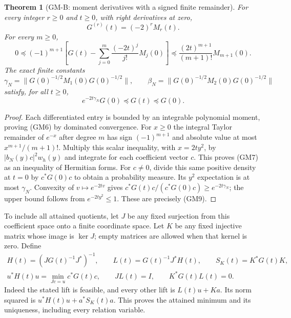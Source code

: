 \documentclass[11pt]{article}
\newtheorem{theorem}{Theorem}
\theoremstyle{remark}\newtheorem{remark}[theorem]{Remark}
\begin{document}
\begin{theorem}[GM-B: moment derivatives with a signed finite remainder]
For every integer $r\geq0$ and $t\geq0$, with right derivatives at zero,
\begin{equation}\tag{GM6}
 G^{(r)}(t)=(-2)^rM_r(t).
\end{equation}
For every $m\geq0$,
\begin{equation}\tag{GM7}
 0\preceq(-1)^{m+1}
 \left[G(t)-\sum_{j=0}^m\frac{(-2t)^j}{j!}M_j(0)\right]
 \preceq\frac{(2t)^{m+1}}{(m+1)!}M_{m+1}(0).
\end{equation}
The exact finite constants
\begin{equation}\tag{GM8}
 \gamma_N=\|G(0)^{-1/2}M_1(0)G(0)^{-1/2}\|,
 \qquad
 \beta_N=\|G(0)^{-1/2}M_2(0)G(0)^{-1/2}\|
\end{equation}
satisfy, for all $t\geq0$,
\begin{equation}\tag{GM9}
 e^{-2t\gamma_N}G(0)\preceq G(t)\preceq G(0).
\end{equation}
\end{theorem}
\begin{proof}
Each differentiated entry is bounded by an integrable polynomial
moment, proving (GM6) by dominated convergence.  For $x\geq0$ the
integral Taylor remainder of $e^{-x}$ after degree $m$ has sign
$(-1)^{m+1}$ and absolute value at most $x^{m+1}/(m+1)!$.
Multiply this scalar inequality, with $x=2ty^2$, by
$|b_N(y)c|^2w_h(y)$ and integrate for each coefficient vector $c$.
This proves (GM7) as an inequality of Hermitian forms.
For $c\ne0$, divide this same positive density at $t=0$ by $c^*G(0)c$
to obtain a probability measure.  Its $y^2$ expectation is at most
$\gamma_N$.  Convexity of $v\mapsto e^{-2tv}$ gives
$c^*G(t)c/(c^*G(0)c)\geq e^{-2t\gamma_N}$; the upper bound follows
from $e^{-2ty^2}\leq1$.  These are precisely (GM9).
\end{proof}

To include all attained quotients, let $J$ be any fixed surjection
from this coefficient space onto a finite coordinate space.  Let $K$
be any fixed injective matrix whose image is $\ker J$; empty matrices
are allowed when that kernel is zero.  Define
\begin{equation}\tag{GM10}
 \begin{gathered}
 H(t)=(JG(t)^{-1}J^*)^{-1},\qquad
 L(t)=G(t)^{-1}J^*H(t),\qquad S_K(t)=K^*G(t)K,\\
 u^*H(t)u=\min_{Jc=u}c^*G(t)c,\qquad JL(t)=I,
 \qquad K^*G(t)L(t)=0.
 \end{gathered}
\end{equation}
Indeed the stated lift is feasible, and every other lift is $L(t)u+Ka$.
Its norm squared is $u^*H(t)u+a^*S_K(t)a$.  This proves the attained
minimum and its uniqueness, including every relation variable.
\end{document}
